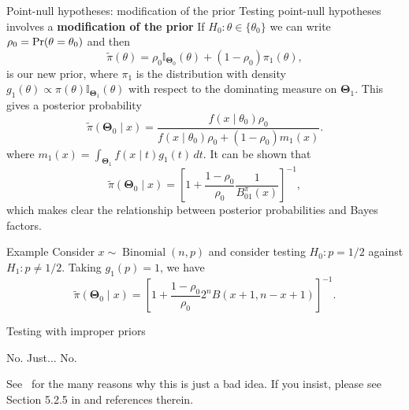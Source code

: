 \begin{frame}{Point-null hypotheses: modification of the prior}
Testing point-null hypotheses involves a \textbf{modification of the prior}
 If $H_0: \theta \in \{\theta_0\}$  we can write $\rho_0 = \operatorname{Pr}(\theta = \theta_0)$ and then
 \begin{equation*}
  \tilde{\pi}(\theta) = \rho_0 \mathbb{I}_{\boldsymbol{\Theta}_0}(\theta) + (1-\rho_0)\pi_1(\theta),
 \end{equation*}
is our new prior, where $\pi_1$ is the distribution with density $g_1(\theta) \propto \pi(\theta)\mathbb{I}_{\boldsymbol{\Theta}_1}(\theta)$ with respect to the dominating measure on $\boldsymbol{\Theta}_1$. 
This gives a posterior probability
\begin{equation*}
 \tilde{\pi}(\boldsymbol{\Theta}_0 \mid x) = \frac{f(x \mid \theta_0)\rho_0}{f(x \mid \theta_0)\rho_0 + (1-\rho_0)m_1(x)}.
\end{equation*}
where $m_1(x) = \int_{\boldsymbol{\Theta}_1} f(x \mid t)g_1(t)\,dt$.
It can be shown that
\begin{equation*}
 \tilde{\pi}(\boldsymbol{\Theta}_0 \mid x) = \left[1 + \frac{1-\rho_0}{\rho_0}\frac{1}{B^\pi_{01}(x)}\right]^{-1}, 
\end{equation*}
which makes clear the relationship between posterior probabilities and Bayes factors.
\end{frame}
\begin{frame}{Example}
Consider $x \sim \operatorname{Binomial}(n, p)$ and consider testing $H_0: p = 1/2$ against $H_1: p \neq 1/2$. 
Taking $g_1(p) = 1$, we have
\begin{equation*}
  \tilde{\pi}(\boldsymbol{\Theta}_0 \mid x) = \left[1 + \frac{1-\rho_0}{\rho_0}2^n B(x+1, n-x+1)\right]^{-1}.
\end{equation*}
\end{frame}
\begin{frame}{Testing with improper priors}
 \begin{idea}
  No. Just... No.
 \end{idea}
See~\cite{Degroot1973} for the many reasons why this is just a bad idea.
If you insist, please see Section 5.2.5 in \cite{Robert2007} and references therein.
\end{frame}
